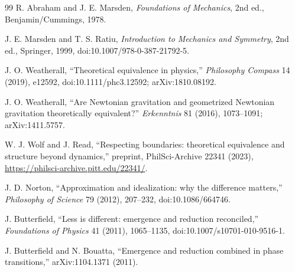 \documentclass[11pt]{article}
\begin{document}
\begin{thebibliography}{99}
R. Abraham and J. E. Marsden,
\emph{Foundations of Mechanics}, 2nd ed., Benjamin/Cummings, 1978.

J. E. Marsden and T. S. Ratiu,
\emph{Introduction to Mechanics and Symmetry}, 2nd ed., Springer, 1999,
doi:10.1007/978-0-387-21792-5.

J. O. Weatherall,
``Theoretical equivalence in physics,''
\emph{Philosophy Compass} 14 (2019), e12592,
doi:10.1111/phc3.12592; arXiv:1810.08192.

J. O. Weatherall,
``Are Newtonian gravitation and geometrized Newtonian gravitation theoretically equivalent?''
\emph{Erkenntnis} 81 (2016), 1073--1091; arXiv:1411.5757.

W. J. Wolf and J. Read,
``Respecting boundaries: theoretical equivalence and structure beyond dynamics,''
preprint, PhilSci-Archive 22341 (2023), \url{https://philsci-archive.pitt.edu/22341/}.

J. D. Norton,
``Approximation and idealization: why the difference matters,''
\emph{Philosophy of Science} 79 (2012), 207--232,
doi:10.1086/664746.

J. Butterfield,
``Less is different: emergence and reduction reconciled,''
\emph{Foundations of Physics} 41 (2011), 1065--1135,
doi:10.1007/s10701-010-9516-1.

J. Butterfield and N. Bouatta,
``Emergence and reduction combined in phase transitions,''
arXiv:1104.1371 (2011).
\end{thebibliography}
\end{document}
